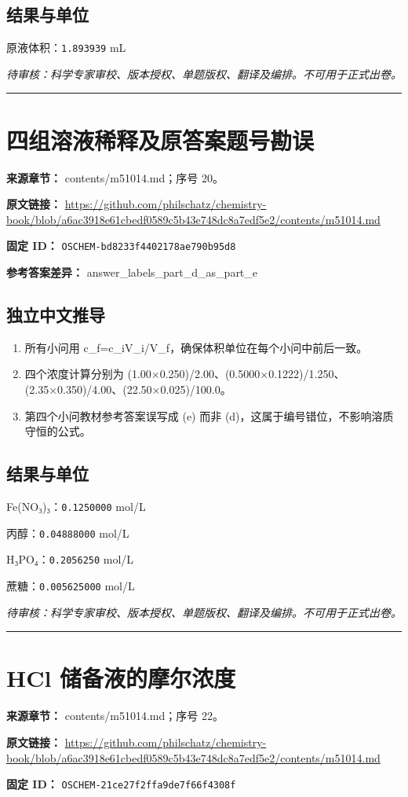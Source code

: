 \documentclass[UTF8,11pt,oneside,openany,fontset=none]{ctexbook}
\begin{document}
\subsection*{结果与单位}
\noindent 原液体积：\texttt{1.893939} mL\par
\noindent\textit{待审核：科学专家审校、版本授权、单题版权、翻译及编排。不可用于正式出卷。}
\medskip\hrule\medskip
\section{四组溶液稀释及原答案题号勘误}
\noindent\textbf{来源章节：} contents/m51014.md；序号 20。\par
\noindent\textbf{原文链接：} \url{https://github.com/philschatz/chemistry-book/blob/a6ac3918e61cbedf0589c5b43e748dc8a7edf5e2/contents/m51014.md}\par
\noindent\textbf{固定 ID：} \texttt{OSCHEM-bd8233f4402178ae790b95d8}\par
\textbf{参考答案差异：} answer\_labels\_part\_d\_as\_part\_e\par
\subsection*{独立中文推导}
\begin{enumerate}
\item 所有小问用 c\_f=c\_iV\_i/V\_f，确保体积单位在每个小问中前后一致。
\item 四个浓度计算分别为 (1.00×0.250)/2.00、(0.5000×0.1222)/1.250、(2.35×0.350)/4.00、(22.50×0.025)/100.0。
\item 第四个小问教材参考答案误写成 (e) 而非 (d)，这属于编号错位，不影响溶质守恒的公式。
\end{enumerate}
\subsection*{结果与单位}
\noindent Fe(NO₃)₃：\texttt{0.1250000} mol/L\par
\noindent 丙醇：\texttt{0.04888000} mol/L\par
\noindent H₃PO₄：\texttt{0.2056250} mol/L\par
\noindent 蔗糖：\texttt{0.005625000} mol/L\par
\noindent\textit{待审核：科学专家审校、版本授权、单题版权、翻译及编排。不可用于正式出卷。}
\medskip\hrule\medskip
\section{HCl 储备液的摩尔浓度}
\noindent\textbf{来源章节：} contents/m51014.md；序号 22。\par
\noindent\textbf{原文链接：} \url{https://github.com/philschatz/chemistry-book/blob/a6ac3918e61cbedf0589c5b43e748dc8a7edf5e2/contents/m51014.md}\par
\noindent\textbf{固定 ID：} \texttt{OSCHEM-21ce27f2ffa9de7f66f4308f}\par
\end{document}

